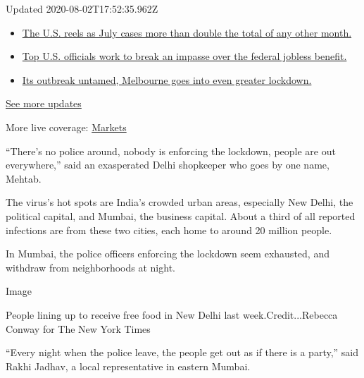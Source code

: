 Updated 2020-08-02T17:52:35.962Z

\begin{itemize}
\tightlist
\item
  \href{https://www.nytimes.com/2020/08/01/world/coronavirus-covid-19.html?action=click\&pgtype=Article\&state=default\&region=MAIN_CONTENT_1\&context=storylines_live_updates\#link-34047410}{The
  U.S. reels as July cases more than double the total of any other
  month.}
\item
  \href{https://www.nytimes.com/2020/08/01/world/coronavirus-covid-19.html?action=click\&pgtype=Article\&state=default\&region=MAIN_CONTENT_1\&context=storylines_live_updates\#link-780ec966}{Top
  U.S. officials work to break an impasse over the federal jobless
  benefit.}
\item
  \href{https://www.nytimes.com/2020/08/01/world/coronavirus-covid-19.html?action=click\&pgtype=Article\&state=default\&region=MAIN_CONTENT_1\&context=storylines_live_updates\#link-2bc8948}{Its
  outbreak untamed, Melbourne goes into even greater lockdown.}
\end{itemize}

\href{https://www.nytimes.com/2020/08/01/world/coronavirus-covid-19.html?action=click\&pgtype=Article\&state=default\&region=MAIN_CONTENT_1\&context=storylines_live_updates}{See
more updates}

More live coverage:
\href{https://www.nytimes.com/live/2020/07/31/business/stock-market-today-coronavirus?action=click\&pgtype=Article\&state=default\&region=MAIN_CONTENT_1\&context=storylines_live_updates}{Markets}

``There's no police around, nobody is enforcing the lockdown, people are
out everywhere,'' said an exasperated Delhi shopkeeper who goes by one
name, Mehtab.

The virus's hot spots are India's crowded urban areas, especially New
Delhi, the political capital, and Mumbai, the business capital. About a
third of all reported infections are from these two cities, each home to
around 20 million people.

In Mumbai, the police officers enforcing the lockdown seem exhausted,
and withdraw from neighborhoods at night.

Image

People lining up to receive free food in New Delhi last
week.Credit...Rebecca Conway for The New York Times

``Every night when the police leave, the people get out as if there is a
party,'' said Rakhi Jadhav, a local representative in eastern Mumbai.

